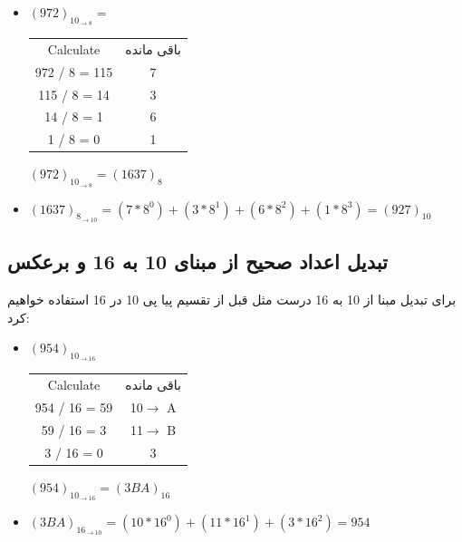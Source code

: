\documentclass[pt, a5paper]{article}
\begin{document}
\begin{itemize}
\item
	$(972)_{10_{\rightarrow 8}} = $
	\begin{table}[ht] \raggedright
		\begin{LTR}
			\begin{tabular}{| c | c |}
				\hline
				Calculate & باقی مانده\\
				972 / 8 = 115 & 7 \\
				115 / 8 = 14  & 3 \\
				14 / 8 = 1    & 6 \\
				1 / 8 = 0     & 1 \\
				\hline
			\end{tabular}
		\end{LTR}
	\end{table}
	$(972)_{10_{\rightarrow 8}} = (1637)_{8}$
	
	\item
	$(1637)_{8_{\rightarrow 10}} = (7 * 8^{0}) + (3 * 8^{1}) + (6 * 8^{2})+ (1 * 8^{3})= (927)_{10}$
\end{itemize}


\subsection{تبدیل اعداد صحیح از مبنای 10 به 16 و برعکس}
برای تبدیل مبنا از 10 به 16 درست مثل قبل از تقسیم پیا پی 10 در 16 استفاده خواهیم کرد:\\

\begin{itemize}
	\item
	$(954)_{10_{\rightarrow 16}}$
	\begin{table}[ht] \raggedright
		\begin{LTR}
			\begin{tabular}{| c | c |}
				\hline
				Calculate & باقی مانده\\
				954  / 16 = 59 & 10$\rightarrow$ A \\
				59  / 16 = 3   & 11$\rightarrow$ B \\
				3  / 16   = 0  & 3 \\
				\hline
			\end{tabular}
		\end{LTR}
	\end{table}
	$(954)_{10_{\rightarrow 16}} = (3BA)_{16}$	
	
	\item
	$(3BA)_{16_{\rightarrow 10}} = (10 * 16^{0}) + (11 * 16^{1}) + (3 * 16^{2}) = 954 $	
\end{itemize}
\end{document}

